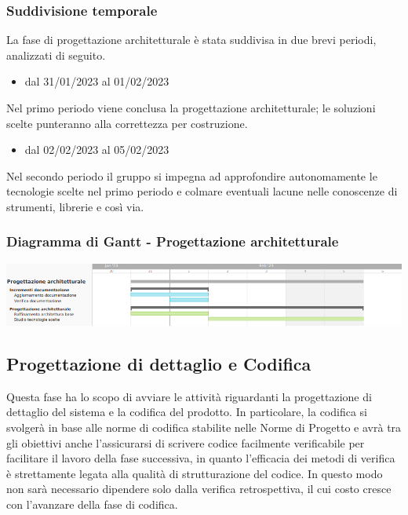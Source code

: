 \subsubsection{Suddivisione temporale}
La fase di progettazione architetturale è stata suddivisa in due brevi periodi, analizzati di
seguito.

\begin{itemize}
	\item dal 31/01/2023 al 01/02/2023
\end{itemize}
Nel primo periodo viene conclusa la progettazione architetturale; le soluzioni scelte punteranno alla correttezza per costruzione.

\begin{itemize}
	\item dal 02/02/2023 al 05/02/2023
\end{itemize}
Nel secondo periodo il gruppo si impegna ad approfondire autonomamente le tecnologie scelte nel primo periodo e colmare eventuali lacune nelle conoscenze di strumenti, librerie e così via.

\subsubsection{Diagramma di Gantt - Progettazione architetturale}
\includegraphics[width=\textwidth]{src/img/4_progettazione.png}\\

\subsection{Progettazione di dettaglio e Codifica}
Questa fase ha lo scopo di avviare le attività riguardanti la progettazione di dettaglio del sistema e la codifica del prodotto.
In particolare, la codifica si svolgerà in base alle norme di codifica stabilite nelle Norme di Progetto e avrà tra gli obiettivi anche l’assicurarsi di scrivere codice facilmente verificabile per facilitare il lavoro della fase successiva, in quanto l'efficacia dei metodi di verifica è strettamente legata alla qualità di strutturazione del codice. In questo modo non sarà necessario dipendere solo dalla verifica retrospettiva, il cui costo cresce con l'avanzare della fase di codifica.

